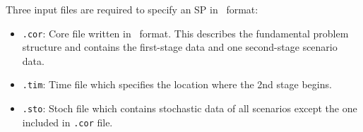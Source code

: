 Three input files are required to specify an SP in \smps\ format:
\begin{itemize}
	\item \texttt{.cor}: Core file written in \mps\ format. This describes the fundamental problem structure and contains the first-stage data and one second-stage scenario data.
	\item \texttt{.tim}: Time file which specifies the location where the 2nd stage begins.
	\item \texttt{.sto}: Stoch file which contains stochastic data of all scenarios except the one included in \texttt{.cor} file.
\end{itemize}
 

